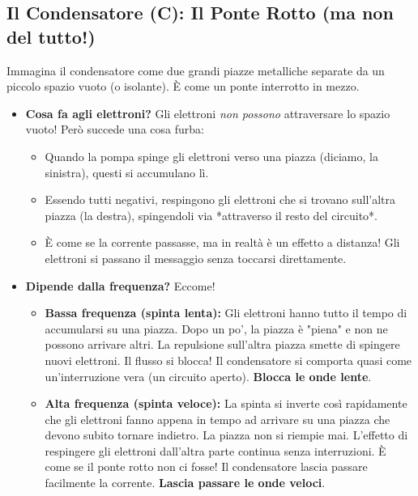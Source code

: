 \documentclass[a4paper, 11pt]{article}
\begin{document}
\subsection*{Il Condensatore (C): Il Ponte Rotto (ma non del tutto!)}
Immagina il condensatore come due grandi piazze metalliche separate da un piccolo spazio vuoto (o isolante). È come un ponte interrotto in mezzo.
\begin{itemize}
    \item \textbf{Cosa fa agli elettroni?} Gli elettroni \textit{non possono} attraversare lo spazio vuoto! Però succede una cosa furba:
        \begin{itemize}
            \item Quando la pompa spinge gli elettroni verso una piazza (diciamo, la sinistra), questi si accumulano lì.
            \item Essendo tutti negativi, respingono gli elettroni che si trovano sull'altra piazza (la destra), spingendoli via *attraverso il resto del circuito*.
            \item È come se la corrente passasse, ma in realtà è un effetto a distanza! Gli elettroni si passano il messaggio senza toccarsi direttamente.
        \end{itemize}
    \item \textbf{Dipende dalla frequenza?} Eccome!
        \begin{itemize}
            \item \textbf{Bassa frequenza (spinta lenta):} Gli elettroni hanno tutto il tempo di accumularsi su una piazza. Dopo un po', la piazza è "piena" e non ne possono arrivare altri. La repulsione sull'altra piazza smette di spingere nuovi elettroni. Il flusso si blocca! Il condensatore si comporta quasi come un'interruzione vera (un circuito aperto). \textbf{Blocca le onde lente}.
            \item \textbf{Alta frequenza (spinta veloce):} La spinta si inverte così rapidamente che gli elettroni fanno appena in tempo ad arrivare su una piazza che devono subito tornare indietro. La piazza non si riempie mai. L'effetto di respingere gli elettroni dall'altra parte continua senza interruzioni. È come se il ponte rotto non ci fosse! Il condensatore lascia passare facilmente la corrente. \textbf{Lascia passare le onde veloci}.
        \end{itemize}
\end{itemize}
\end{document}

